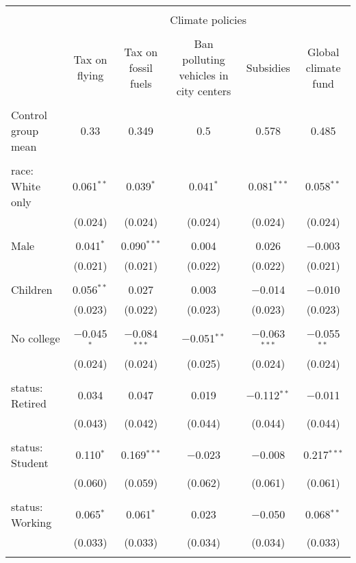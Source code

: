 
\begin{tabular}{@{\extracolsep{5pt}}lccccc} 
\\[-1.8ex]\hline 
\hline \\[-1.8ex] 
 & \multicolumn{5}{c}{Climate policies} \\ 
\cline{2-6} 
\\[-1.8ex] & Tax on flying & Tax on fossil fuels & Ban polluting vehicles in city centers & Subsidies & Global climate fund \\ 
\hline \\[-1.8ex] 
 Control group mean & 0.33 & 0.349 & 0.5 & 0.578 & 0.485  \\ \hline \\[-1.8ex] race: White only & 0.061$^{**}$ & 0.039$^{*}$ & 0.041$^{*}$ & 0.081$^{***}$ & 0.058$^{**}$ \\ 
  & (0.024) & (0.024) & (0.024) & (0.024) & (0.024) \\ 
  & & & & & \\ 
 Male & 0.041$^{*}$ & 0.090$^{***}$ & 0.004 & 0.026 & $-$0.003 \\ 
  & (0.021) & (0.021) & (0.022) & (0.022) & (0.021) \\ 
  & & & & & \\ 
 Children & 0.056$^{**}$ & 0.027 & 0.003 & $-$0.014 & $-$0.010 \\ 
  & (0.023) & (0.022) & (0.023) & (0.023) & (0.023) \\ 
  & & & & & \\ 
 No college & $-$0.045$^{*}$ & $-$0.084$^{***}$ & $-$0.051$^{**}$ & $-$0.063$^{***}$ & $-$0.055$^{**}$ \\ 
  & (0.024) & (0.024) & (0.025) & (0.024) & (0.024) \\ 
  & & & & & \\ 
 status: Retired & 0.034 & 0.047 & 0.019 & $-$0.112$^{**}$ & $-$0.011 \\ 
  & (0.043) & (0.042) & (0.044) & (0.044) & (0.044) \\ 
  & & & & & \\ 
 status: Student & 0.110$^{*}$ & 0.169$^{***}$ & $-$0.023 & $-$0.008 & 0.217$^{***}$ \\ 
  & (0.060) & (0.059) & (0.062) & (0.061) & (0.061) \\ 
  & & & & & \\ 
 status: Working & 0.065$^{*}$ & 0.061$^{*}$ & 0.023 & $-$0.050 & 0.068$^{**}$ \\ 
  & (0.033) & (0.033) & (0.034) & (0.034) & (0.033) \\ 
  & & & & & \\ 

\end{tabular}
